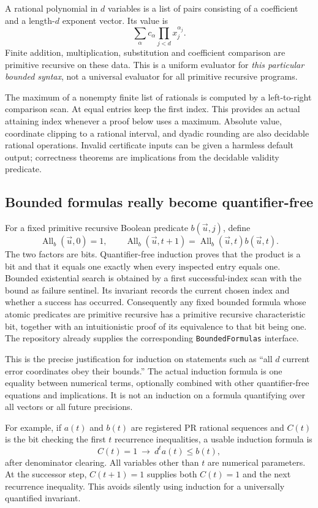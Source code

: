 A rational polynomial in \(d\) variables is a list of pairs consisting of
a coefficient and a length-\(d\) exponent vector. Its value is
\[
 \sum_{\alpha}c_{\alpha}\prod_{j<d}x_j^{\alpha_j}.
\]
Finite addition, multiplication, substitution and coefficient comparison
are primitive recursive on these data. This is a uniform evaluator for
\emph{this particular bounded syntax}, not a universal evaluator for
all primitive recursive programs.

The maximum of a nonempty finite list of rationals is computed by a
left-to-right comparison scan. At equal entries keep the first index.
This provides an actual attaining index whenever a proof below uses a
maximum. Absolute value, coordinate clipping to a rational interval,
and dyadic rounding are also decidable rational operations. Invalid
certificate inputs can be given a harmless default output; correctness
theorems are implications from the decidable validity predicate.

\subsection{Bounded formulas really become quantifier-free}

For a fixed primitive recursive Boolean predicate \(b(\vec u,j)\), define
\[
 \operatorname{All}_b(\vec u,0)=1,\qquad
 \operatorname{All}_b(\vec u,t+1)
   =\operatorname{All}_b(\vec u,t)b(\vec u,t).
\]
The two factors are bits. Quantifier-free induction proves that the
product is a bit and that it equals one exactly when every inspected
entry equals one. Bounded existential search is obtained by a first
successful-index scan with the bound as failure sentinel. Its invariant
records the current chosen index and whether a success has occurred.
Consequently any fixed bounded formula whose atomic predicates are
primitive recursive has a primitive recursive characteristic bit,
together with an intuitionistic proof of its equivalence to that bit
being one. The repository already supplies the corresponding
\texttt{BoundedFormulas} interface.

This is the precise justification for induction on statements such as
``all \(d\) current error coordinates obey their bounds.'' The actual
induction formula is one equality between numerical terms, optionally
combined with other quantifier-free equations and implications. It is
not an induction on a formula quantifying over all vectors or all
future precisions.

For example, if \(a(t)\) and \(b(t)\) are registered PR rational
sequences and \(C(t)\) is the bit checking the first \(t\) recurrence
inequalities, a usable induction formula is
\[
 C(t)=1\ \longrightarrow\ d^t a(t)\le b(t),
 \tag{6}\label{eq:qf-invariant}
\]
after denominator clearing. All variables other than \(t\) are numerical
parameters. At the successor step, \(C(t+1)=1\) supplies both
\(C(t)=1\) and the next recurrence inequality. This avoids silently
using induction for a universally quantified invariant.

